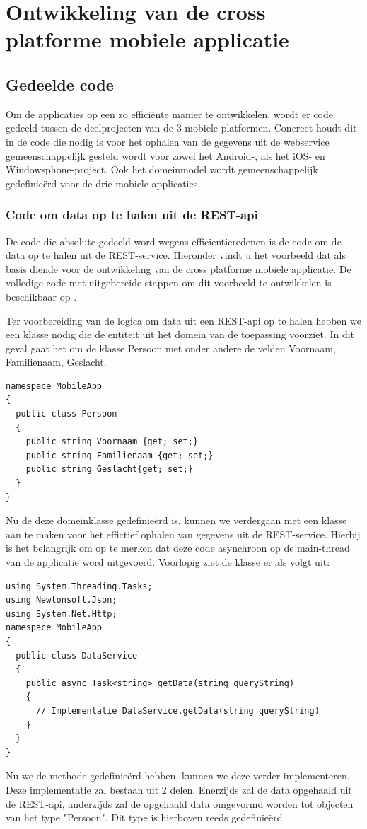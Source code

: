 \section{Ontwikkeling van de cross platforme mobiele applicatie}
\subsection{Gedeelde code}
Om de applicaties op een zo efficiënte manier te ontwikkelen, wordt er code gedeeld tussen de deelprojecten van de 3 mobiele
platformen. Concreet houdt dit in de code die nodig is voor het ophalen van de gegevens uit de webservice gemeenschappelijk
gesteld wordt voor zowel het Android-, als het iOS- en Windowsphone-project. Ook het domeinmodel wordt gemeenschappelijk
gedefinieërd voor de drie mobiele applicaties.

\subsubsection{Code om data op te halen uit de REST-api}


De code die absolute gedeeld word wegens efficientieredenen is de code om de data op te halen uit de REST-service.
Hieronder vindt u het voorbeeld dat als basis diende voor de ontwikkeling van de cross platforme mobiele applicatie.
De volledige code met uitgebereide stappen om dit voorbeeld te ontwikkelen is beschikbaar op \citep{buildappwithnativeuiusingxamarininvisualstudio}.

Ter voorbereiding van de logica om data uit een REST-api op te halen hebben we een klasse nodig die de entiteit uit het
domein van de toepassing voorziet. In dit geval gaat het om de klasse Persoon met onder andere de velden Voornaam, Familienaam, Geslacht.
\begin{lstlisting}
namespace MobileApp
{
  public class Persoon
  {
    public string Voornaam {get; set;}
    public string Familienaam {get; set;}
    public string Geslacht{get; set;}
  }
}
\end{lstlisting}
Nu de deze domeinklasse gedefinieërd is, kunnen we verdergaan met een klasse aan te maken voor het effictief ophalen van
gegevens uit de REST-service. Hierbij is het belangrijk om op te merken dat deze code asynchroon op de main-thread van de
applicatie word uitgevoerd. Voorlopig ziet de klasse er als volgt uit:
\begin{lstlisting}
using System.Threading.Tasks;
using Newtonsoft.Json;
using System.Net.Http;
namespace MobileApp
{
  public class DataService
  {
    public async Task<string> getData(string queryString)
    {
      // Implementatie DataService.getData(string queryString)
    }
  }
}
\end{lstlisting}
Nu we de methode gedefinieërd hebben, kunnen we deze verder implementeren.
Deze implementatie zal bestaan uit 2 delen. Enerzijds zal de data opgehaald uit de REST-api, anderzijds zal de opgehaald data
omgevormd worden tot objecten van het type "Persoon". Dit type is hierboven reeds gedefinieërd.

